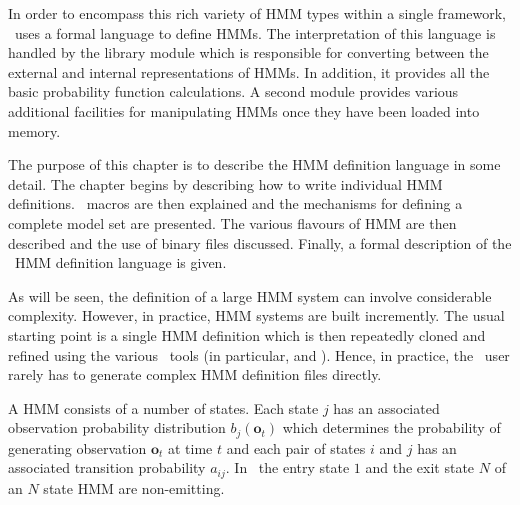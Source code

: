 In order to encompass this rich variety of HMM types within
a single framework, \HTK\ uses a formal language 
to define HMMs.  The interpretation of this language is handled
by the library module  which is responsible for converting
between the external and internal representations of HMMs.  In addition,
it provides all the basic probability function calculations.
A second module  provides various additional facilities for
manipulating HMMs once they have been loaded into memory.

The purpose of this chapter is to describe
the HMM definition language in some detail.  The chapter begins by 
describing how to write
individual HMM definitions.  \HTK\ macros are
then explained and the mechanisms for defining a complete
model set are presented.  The various flavours of
HMM are then described and the use of binary files discussed.
Finally, a formal description of the \HTK\ HMM definition
language is given.

As will be seen, the definition of a large 
HMM system can involve considerable complexity.  However, in
practice, HMM systems are built incremently.  The usual 
starting point is a single HMM definition which is then
repeatedly cloned and refined using the various \HTK\ tools
(in particular,  and ).
Hence, in practice, the \HTK\ user rarely has to 
generate complex HMM definition files directly.  


A HMM consists of a number of states.  Each state $j$ has an associated
observation probability distribution $b_{j}(\bm{o}_t)$  which
determines the probability of generating observation $\bm{o}_t$ at
time $t$ and each pair of states $i$ and $j$ has an associated
transition probability $a_{ij}$.  In \HTK\,  the entry state $1$ and
the exit state $N$ of an $N$ state HMM are non-emitting.  


